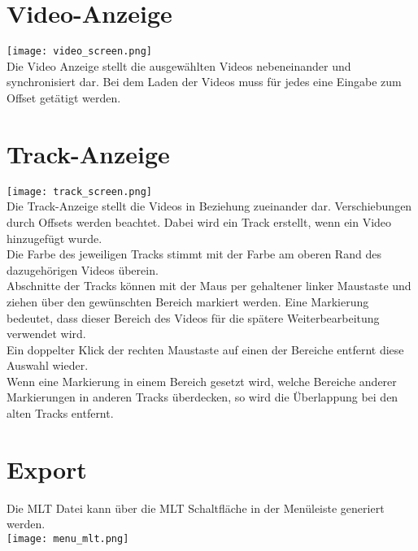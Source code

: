 \section{Video-Anzeige}
\texttt{[image: video\_screen.png]}
\vspace{5mm}
\\
Die Video Anzeige stellt die ausgewählten Videos nebeneinander und synchronisiert dar.
Bei dem Laden der Videos muss für jedes eine Eingabe zum Offset getätigt werden.

\section{Track-Anzeige}
\texttt{[image: track\_screen.png]}
\vspace{5mm}
\\
Die Track-Anzeige stellt die Videos in Beziehung zueinander dar. Verschiebungen durch Offsets werden beachtet. Dabei wird ein Track erstellt, wenn ein Video hinzugefügt wurde.\\
Die Farbe des jeweiligen Tracks stimmt mit der Farbe am oberen Rand des dazugehörigen Videos überein. \\
Abschnitte der Tracks können mit der Maus per gehaltener linker Maustaste und ziehen über den gewünschten Bereich markiert werden. Eine Markierung bedeutet, dass dieser Bereich des Videos für die spätere Weiterbearbeitung verwendet wird.    \\
Ein doppelter Klick der rechten Maustaste auf einen der Bereiche entfernt diese Auswahl wieder. \\
Wenn eine Markierung in einem Bereich gesetzt wird, welche Bereiche anderer Markierungen in anderen Tracks überdecken, so wird die Überlappung bei den alten Tracks entfernt.   
\section{Export}
Die MLT Datei kann über die MLT Schaltfläche in der Menüleiste generiert werden.\\
\texttt{[image: menu\_mlt.png]}

